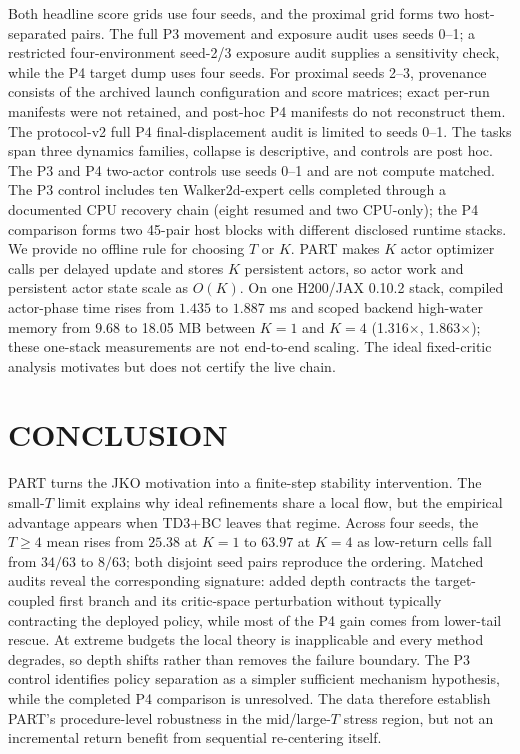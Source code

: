 \documentclass[twoside]{article}
\begin{document}
Both headline score grids use four seeds, and the proximal grid forms two
host-separated pairs. The full P3 movement and exposure audit uses seeds 0--1;
a restricted four-environment seed-2/3 exposure audit supplies a sensitivity
check, while the P4 target dump uses four seeds. For proximal seeds 2--3,
provenance consists of the archived launch configuration and score matrices;
exact per-run manifests were not retained, and post-hoc P4 manifests do not
reconstruct them. The protocol-v2 full P4 final-displacement audit is limited
to seeds 0--1. The tasks span three dynamics families, collapse is descriptive, and controls
are post hoc. The P3 and P4 two-actor controls use seeds 0--1 and are not compute matched.
The P3 control includes ten Walker2d-expert cells completed through a
documented CPU recovery chain (eight resumed and two CPU-only); the P4
comparison forms two 45-pair host blocks with different disclosed runtime
stacks. We provide no
offline rule for choosing $T$ or $K$. PART makes $K$ actor optimizer calls per
delayed update and stores $K$ persistent actors, so actor work and persistent
actor state scale as $O(K)$. On one H200/JAX 0.10.2 stack, compiled actor-phase
time rises from $1.435$ to $1.887$ ms and scoped backend high-water memory from
9.68 to 18.05 MB between $K=1$ and $K=4$ (1.316$\times$, 1.863$\times$); these
one-stack measurements are not end-to-end scaling. The ideal fixed-critic
analysis motivates but does not certify the live chain.

\section{CONCLUSION}
\label{sec:conclusion}

PART turns the JKO motivation into a finite-step stability intervention. The
small-$T$ limit explains why ideal refinements share a local flow, but the
empirical advantage appears when TD3+BC leaves that regime. Across four seeds,
the $T\ge4$ mean rises from $25.38$ at $K=1$ to $63.97$ at $K=4$ as low-return
cells fall from $34/63$ to $8/63$; both disjoint seed pairs reproduce the
ordering. Matched audits reveal the corresponding signature: added depth
contracts the target-coupled first branch and its critic-space perturbation
without typically contracting the deployed policy, while most of the P4 gain
comes from lower-tail rescue. At extreme budgets the local theory is
inapplicable and every method degrades, so depth shifts rather than removes the
failure boundary. The P3 control identifies policy separation as a simpler
sufficient mechanism hypothesis, while the completed P4 comparison is
unresolved. The data therefore establish PART's procedure-level robustness in
the mid/large-$T$ stress region, but not an incremental return benefit from
sequential re-centering itself.



\end{document}
